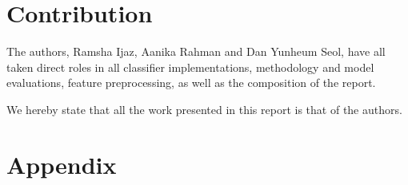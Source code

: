 \documentclass[comsoc,conference]{IEEEtran}
\begin{document}
\section{Contribution} 
The authors, Ramsha Ijaz, Aanika Rahman and Dan Yunheum Seol, have all taken direct roles in all classifier implementations, methodology and model evaluations, feature preprocessing, as well as the composition of the report. 

We hereby state that all the work presented in this report is that of the authors.




\newpage
\onecolumn
\section*{Appendix}
\end{document}
